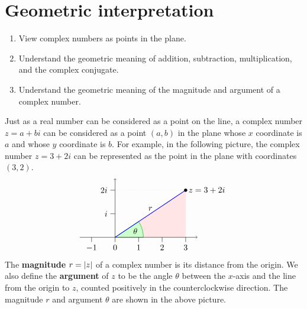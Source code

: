 \section{Geometric interpretation}

\begin{outcome}
  \begin{enumerate}
  \item View complex numbers as points in the plane.
  \item Understand the geometric meaning of addition, subtraction, 
    multiplication, and the complex conjugate.
  \item Understand the geometric meaning of the magnitude and argument
    of a complex number. 
  \end{enumerate}
\end{outcome}

Just as a real number can be considered as a point on the line, a
complex number $z = a + bi$ can be considered as a point $(a,b)$ in
the plane whose $x$ coordinate is $a$ and whose $y$ coordinate is
$b$. For example, in the following picture, the complex number
$z = 3+2i$ can be represented as the point in the plane with
coordinates $(3,2)$.
\begin{equation*}
  \begin{tikzpicture}
    \draw[help lines, dotted, fill=red!10] (0,0) -- (3,0) -- (3,2) -- cycle;
    \draw[help lines, dotted] (0,2) -- (3,2);
    \filldraw[fill=green!20,draw=green!50!black] (0,0) -- (1.2,0) arc (0:33.69:1.2) -- cycle;
    \node at (16.845:9mm){$\theta$};
    \draw[->](-1.5,0) -- (3.5,0);
    \draw[->](0,0) -- (0,2.5);
    \draw(0,1) -- +(-0.2,0) node[left] {$i$};
    \draw(0,2) -- +(-0.2,0) node[left] {$2i$};
    \draw(-1,0) -- +(0,-0.2) node[below] {$-1$};
    \draw(0,0) -- +(0,-0.2) node[below] {$0$};
    \draw(1,0) -- +(0,-0.2) node[below] {$1$};
    \draw(2,0) -- +(0,-0.2) node[below] {$2$};
    \draw(3,0) -- +(0,-0.2) node[below] {$3$};
    \draw[thick, blue] (0,0) -- node[above, black] {$r$} (3,2);
    \draw[fill, black] (3,2) circle [radius=1.8pt] node [right] {$z = 3+2i$};
  \end{tikzpicture}
\end{equation*}
The \textbf{magnitude}%
%
 $r=\left|z\right|$ of a complex number
is its distance from the origin. We also define the \textbf{argument}
of $z$ to be the angle $\theta$ between the $x$-axis and the line from
the origin to $z$, counted positively in the counterclockwise
direction. The magnitude $r$ and argument $\theta$ are shown in the
above picture.

